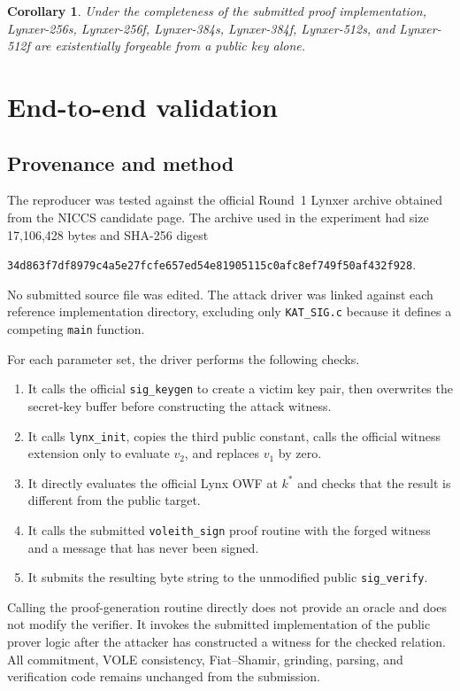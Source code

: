 \documentclass[11pt,a4paper]{article}
\newtheorem{corollary}[theorem]{Corollary}
\begin{document}
\begin{corollary}
Under the completeness of the submitted proof implementation, Lynxer-256s, Lynxer-256f,
Lynxer-384s, Lynxer-384f, Lynxer-512s, and Lynxer-512f are existentially forgeable from a
public key alone.
\end{corollary}

\section{End-to-end validation}

\subsection{Provenance and method}

The reproducer was tested against the official Round~1 Lynxer archive obtained from the
NICCS candidate page.  The archive used in the experiment had size 17,106,428 bytes and
SHA-256 digest
\begin{center}
\small\texttt{34d863f7df8979c4a5e27fcfe657ed54e81905115c0afc8ef749f50af432f928}.
\end{center}
No submitted source file was edited.  The attack driver was linked against each reference
implementation directory, excluding only \texttt{KAT\_SIG.c} because it defines a competing
\texttt{main} function.

For each parameter set, the driver performs the following checks.
\begin{enumerate}[leftmargin=1.7em]
  \item It calls the official \texttt{sig\_keygen} to create a victim key pair, then
        overwrites the secret-key buffer before constructing the attack witness.
  \item It calls \texttt{lynx\_init}, copies the third public constant, calls the official
        witness extension only to evaluate $v_2$, and replaces $v_1$ by zero.
  \item It directly evaluates the official Lynx OWF at $k^*$ and checks that the result is
        different from the public target.
  \item It calls the submitted \texttt{voleith\_sign} proof routine with the forged witness
        and a message that has never been signed.
  \item It submits the resulting byte string to the unmodified public \texttt{sig\_verify}.
\end{enumerate}
Calling the proof-generation routine directly does not provide an oracle and does not modify
the verifier.  It invokes the submitted implementation of the public prover logic after the
attacker has constructed a witness for the checked relation.  All commitment, VOLE
consistency, Fiat--Shamir, grinding, parsing, and verification code remains unchanged from
the submission.
\end{document}
